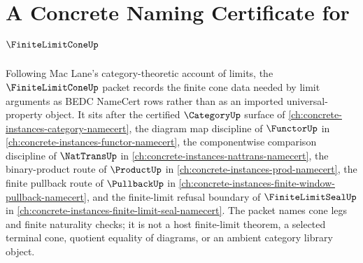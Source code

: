 \chapter{A Concrete Naming Certificate for $\FiniteLimitConeUp$}
\label{ch:concrete-instances-finite-limit-cone-namecert}

Following Mac Lane's category-theoretic account of limits, the $\FiniteLimitConeUp$ packet records the finite cone data needed by limit arguments as BEDC NameCert rows rather than as an imported universal-property object. It sits after the certified $\CategoryUp$ surface of \autoref{ch:concrete-instances-category-namecert}, the diagram map discipline of $\FunctorUp$ in \autoref{ch:concrete-instances-functor-namecert}, the componentwise comparison discipline of $\NatTransUp$ in \autoref{ch:concrete-instances-nattrans-namecert}, the binary-product route of $\ProductUp$ in \autoref{ch:concrete-instances-prod-namecert}, the finite pullback route of $\PullbackUp$ in \autoref{ch:concrete-instances-finite-window-pullback-namecert}, and the finite-limit refusal boundary of $\FiniteLimitSealUp$ in \autoref{ch:concrete-instances-finite-limit-seal-namecert}. The packet names cone legs and finite naturality checks; it is not a host finite-limit theorem, a selected terminal cone, quotient equality of diagrams, or an ambient category library object.

